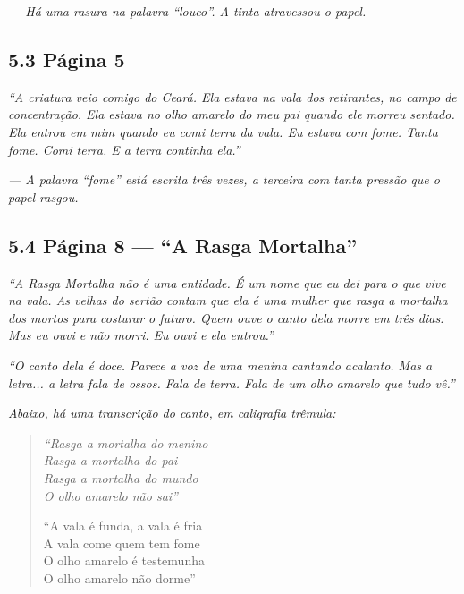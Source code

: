 \vspace{0.5em}
\noindent\textit{--- Há uma rasura na palavra ``louco''. A tinta atravessou o papel.}

\vspace{1em}

\subsection*{5.3 Página 5}

\vspace{0.5em}

\noindent\textit{``A criatura veio comigo do Ceará. Ela estava na vala dos retirantes, no campo de concentração. Ela estava no olho amarelo do meu pai quando ele morreu sentado. Ela entrou em mim quando eu comi terra da vala. Eu estava com fome. Tanta fome. Comi terra. E a terra continha ela.''
}

\vspace{0.5em}
\noindent\textit{--- A palavra ``fome'' está escrita três vezes, a terceira com tanta pressão que o papel rasgou.}

\vspace{1em}

\subsection*{5.4 Página 8 --- ``A Rasga Mortalha''}

\vspace{0.5em}

\noindent\textit{``A Rasga Mortalha não é uma entidade. É um nome que eu dei para o que vive na vala. As velhas do sertão contam que ela é uma mulher que rasga a mortalha dos mortos para costurar o futuro. Quem ouve o canto dela morre em três dias. Mas eu ouvi e não morri. Eu ouvi e ela entrou.''
}

\vspace{0.5em}

\noindent\textit{``O canto dela é doce. Parece a voz de uma menina cantando acalanto. Mas a letra... a letra fala de ossos. Fala de terra. Fala de um olho amarelo que tudo vê.''
}

\vspace{0.5em}

\noindent\textit{Abaixo, há uma transcrição do canto, em caligrafia trêmula:}

\vspace{0.5em}

\begin{quote}
\itshape
``Rasga a mortalha do menino \\
Rasga a mortalha do pai \\
Rasga a mortalha do mundo \\
O olho amarelo não sai''

\vspace{0.3em}

``A vala é funda, a vala é fria \\
A vala come quem tem fome \\
O olho amarelo é testemunha \\
O olho amarelo não dorme''
\end{quote}

